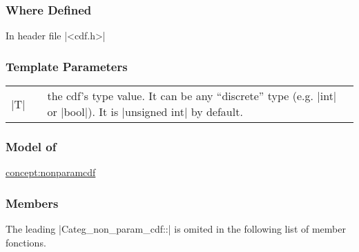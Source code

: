 \documentclass[12pt,twoside]{report}
\begin{document}
\htmlrule[CLEAR=all]  \subsubsection*{Where Defined}
In header file |<cdf.h>|

\htmlrule[CLEAR=all]  \subsubsection*{Template Parameters}
\begin{tabular}[!h]{l l p{10cm}}
|T| & & the cdf's type value. It can be any ``discrete'' type (e.g. |int| or |bool|). It is |unsigned int| by default.\\
\end{tabular}


\htmlrule[CLEAR=all]  \subsubsection*{Model of}
\hyperref{Non-Parametric Cdf}{Non-Parametric Cdf (see Section}{)}{concept:nonparamcdf}


\htmlrule[CLEAR=all]  \subsubsection*{Members}
The leading |Categ_non_param_cdf::| is omited in the following list of member fonctions.
\end{document}

